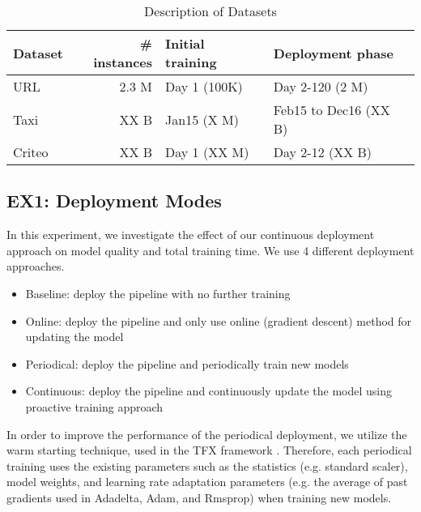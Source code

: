 \begin{table}[h!]
\centering
\begin{tabular}{lrll}
\hline
\textbf{Dataset}  & \textbf{\# instances} & \textbf{Initial training} & \textbf{Deployment phase} \\
\hline
URL             & 2.3 M           & Day 1 (100K)              & Day 2-120 (2 M)           \\
Taxi            & XX B              & Jan15 (X M)               & Feb15 to Dec16 (XX B)     \\
Criteo          & XX B            & Day 1 (XX M)              & Day 2-12 (XX B)        \\
\hline
\end{tabular}
\caption{Description of Datasets}  
\label{dataset-description}
\end{table}


\subsection{EX1: Deployment Modes}
In this experiment, we investigate the effect of our continuous deployment approach on model quality and total training time.
We use 4 different deployment approaches.
\begin{itemize}
\item Baseline: deploy the pipeline with no further training
\item Online: deploy the pipeline and only use online (gradient descent) method for updating the model
\item Periodical: deploy the pipeline and periodically train new models 
\item Continuous: deploy the pipeline and continuously update the model using proactive training approach
\end{itemize}

In order to improve the performance of the periodical deployment, we utilize the warm starting technique, used in the TFX framework \cite{baylor2017tfx}.
Therefore, each periodical training uses the existing parameters such as the statistics (e.g. standard scaler), model weights, and learning rate adaptation parameters (e.g. the average of past gradients used in Adadelta, Adam, and Rmsprop) when training new models.


